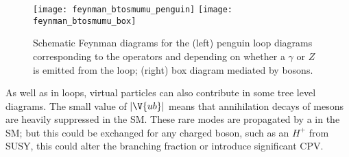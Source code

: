 \begin{figure}
  \begin{center}
    \texttt{[image: feynman\_btosmumu\_penguin]}
    \texttt{[image: feynman\_btosmumu\_box]}
    \caption[Schematic Feynman diagrams for loop and box diagrams]
    {\small
      Schematic Feynman diagrams for the
      (left) penguin loop diagrams corresponding to the operators  and  depending on
      whether a $\gamma$ or $Z$ is emitted from the loop;
      (right)  box diagram mediated by \Wp bosons.
    }
    \label{fig:hhh:loops}
  \end{center}
\end{figure}

As well as in loops, virtual particles can also contribute in some tree level diagrams.
The small value of $|\V{ub}|$ means that annihilation decays of \Bp mesons are heavily
suppressed in the SM.
These rare modes are propagated by a \Wp in the SM; but this could be exchanged for any charged
boson, such as an $H^+$ from SUSY, this could alter the branching fraction or
introduce significant CPV.










